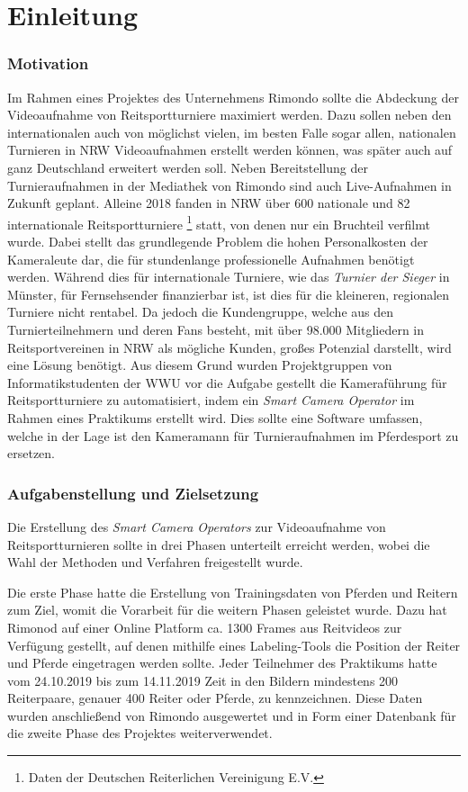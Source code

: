 \chapter{Einleitung}


\subsection*{Motivation}

Im Rahmen eines Projektes des Unternehmens Rimondo sollte die Abdeckung der Videoaufnahme von Reitsportturniere maximiert werden. Dazu sollen neben den internationalen auch von möglichst vielen, im besten Falle sogar allen, nationalen Turnieren in NRW Videoaufnahmen erstellt werden können, was später auch auf ganz Deutschland erweitert werden soll. Neben Bereitstellung der Turnieraufnahmen in der Mediathek von Rimondo sind auch Live-Aufnahmen in Zukunft geplant. Alleine 2018 fanden in NRW über 600 nationale und 82 internationale Reitsportturniere \footnote{Daten der Deutschen Reiterlichen Vereinigung E.V.} statt, von denen nur ein Bruchteil verfilmt wurde.
Dabei stellt das grundlegende Problem die hohen Personalkosten der Kameraleute dar, die für stundenlange professionelle Aufnahmen benötigt werden. Während dies für internationale Turniere, wie das \emph{Turnier der Sieger} in Münster, für Fernsehsender finanzierbar ist, ist dies für die kleineren, regionalen Turniere nicht rentabel. Da jedoch die Kundengruppe, welche aus den Turnierteilnehmern und deren Fans besteht, mit über 98.000 Mitgliedern in Reitsportvereinen in NRW als mögliche Kunden, großes Potenzial darstellt, wird eine Lösung benötigt. Aus diesem Grund wurden Projektgruppen von Informatikstudenten der WWU vor die Aufgabe gestellt die Kameraführung für Reitsportturniere zu automatisiert, indem ein \emph{Smart Camera Operator} im Rahmen eines Praktikums erstellt wird. Dies sollte eine Software umfassen, welche in der Lage ist den Kameramann für Turnieraufnahmen im Pferdesport zu ersetzen.



\subsection*{Aufgabenstellung und Zielsetzung}

Die Erstellung des \emph{Smart Camera Operators} zur Videoaufnahme von Reitsportturnieren sollte in drei Phasen unterteilt erreicht werden, wobei die Wahl der Methoden und Verfahren freigestellt wurde.

Die erste Phase hatte die Erstellung von Trainingsdaten von Pferden und Reitern zum Ziel, womit die Vorarbeit für die weitern Phasen geleistet wurde. Dazu hat Rimonod auf einer Online Platform ca. 1300 Frames aus Reitvideos zur Verfügung gestellt, auf denen mithilfe eines Labeling-Tools die Position der Reiter und Pferde eingetragen werden sollte. Jeder Teilnehmer des Praktikums hatte vom 24.10.2019 bis zum 14.11.2019 Zeit in den Bildern mindestens 200 Reiterpaare, genauer 400 Reiter oder Pferde, zu kennzeichnen. Diese Daten wurden anschließend von Rimondo ausgewertet und in Form einer Datenbank für die zweite Phase des Projektes weiterverwendet. 

